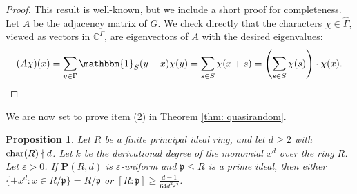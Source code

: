 \documentclass{amsart}
\newtheorem{proposition}[theorem]{Proposition}
\theoremstyle{definition}
\numberwithin{equation}{section}
\newcommand{\C}{\mathbb{C}}
\newcommand{\p}{\mathfrak{p}}
\newcommand{\bfP}{\mathbf{P}}
\newcommand{\eps}{\varepsilon}
\renewcommand{\hat}{\widehat}
\newcommand{\ind}{\mathbbm{1}}
\begin{document}
\begin{proof}
    This result is well-known, but we include a short proof for completeness.
    Let $A$ be the adjacency matrix of $G$.
    We check directly that the characters $\chi \in \hat{\Gamma}$, viewed as vectors in $\C^{\Gamma}$, are eigenvectors of $A$ with the desired eigenvalues:
    \begin{equation*}
        (A\chi)(x) = \sum_{y \in \Gamma} \ind_S(y-x) \chi(y) = \sum_{s \in S} \chi(x+s) = \left( \sum_{s \in S} \chi(s) \right) \cdot \chi(x).
    \end{equation*}
\end{proof}

We are now set to prove item (2) in Theorem \ref{thm: quasirandom}.

\begin{proposition}
    Let $R$ be a finite principal ideal ring, and let $d \ge 2$ with $\textup{char}(R) \nmid d$.
	Let $k$ be the derivational degree of the monomial $x^d$ over the ring $R$.
	Let $\eps > 0$.
	If $\bfP(R,d)$ is $\eps$-uniform and $\p \le R$ is a prime ideal, then either $\{\pm x^d : x \in R/\p\} = R/\p$ or $[R:\p] \ge \frac{d-1}{64d^2\eps^2}$.
\end{proposition}
\end{document}
